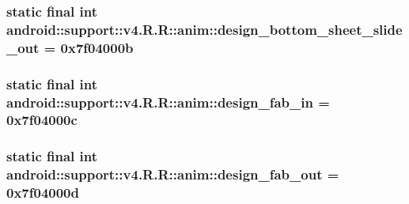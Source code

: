 \hypertarget{classandroid_1_1support_1_1v4_1_1_r_1_1anim_cc121a7a543362b5fc483e76cb5c5594}{
\subsubsection[{design\_\-bottom\_\-sheet\_\-slide\_\-out}]{\setlength{\rightskip}{0pt plus 5cm}static final int android::support::v4.R.R::anim::design\_\-bottom\_\-sheet\_\-slide\_\-out = 0x7f04000b}}
\label{classandroid_1_1support_1_1v4_1_1_r_1_1anim_cc121a7a543362b5fc483e76cb5c5594}


\hypertarget{classandroid_1_1support_1_1v4_1_1_r_1_1anim_562c696c38dea3cf97d66a5ee981fed2}{
\subsubsection[{design\_\-fab\_\-in}]{\setlength{\rightskip}{0pt plus 5cm}static final int android::support::v4.R.R::anim::design\_\-fab\_\-in = 0x7f04000c}}
\label{classandroid_1_1support_1_1v4_1_1_r_1_1anim_562c696c38dea3cf97d66a5ee981fed2}


\hypertarget{classandroid_1_1support_1_1v4_1_1_r_1_1anim_b0031e85ffa2796ba33e641f229c24e7}{
\subsubsection[{design\_\-fab\_\-out}]{\setlength{\rightskip}{0pt plus 5cm}static final int android::support::v4.R.R::anim::design\_\-fab\_\-out = 0x7f04000d}}
\label{classandroid_1_1support_1_1v4_1_1_r_1_1anim_b0031e85ffa2796ba33e641f229c24e7}


